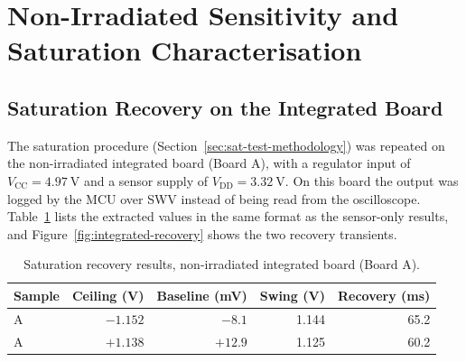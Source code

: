 \documentclass[12pt,a4paper]{article}
\begin{document}
\section{Non-Irradiated Sensitivity and Saturation Characterisation}
\label{sec:nonirr-characterisation}

\subsection{Saturation Recovery on the Integrated Board}
\label{sec:sat-recovery-integrated}

The saturation procedure (Section~\ref{sec:sat-test-methodology}) was repeated on the non-irradiated integrated board (Board A), with a regulator input of $V_{\text{CC}} = \SI{4.97}{\volt}$ and a sensor supply of $V_{\text{DD}} = \SI{3.32}{\volt}$. On this board the output was logged by the MCU over SWV instead of being read from the oscilloscope. Table~\ref{tab:sat-ceiling-intl} lists the extracted values in the same format as the sensor-only results, and Figure~\ref{fig:integrated-recovery} shows the two recovery transients.

\begin{table}[H]
\centering
\caption{Saturation recovery results, non-irradiated integrated board (Board A).}
\label{tab:sat-ceiling-intl}
\begin{tabular}{@{}lrrrr@{}}
\toprule
Sample & Ceiling (V) & Baseline (mV) & Swing (V) & Recovery (ms) \\
\midrule
A & $-1.152$ & $-8.1$ & 1.144 & 65.2 \\
A & $+1.138$ & $+12.9$ & 1.125 & 60.2 \\
\bottomrule
\end{tabular}
\end{table}
\end{document}
